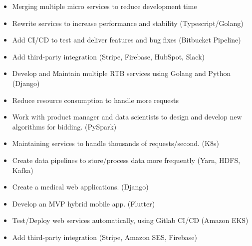 \documentclass[10pt,a4paper,ragged2e]{altacv}
\begin{document}

\begin{fullwidth}
\makecvheader
\end{fullwidth}



\begin{itemize}
    \item Merging multiple micro services to reduce development time
    \item Rewrite services to increase performance and stability (Typescript/Golang)
    \item Add CI/CD to test and deliver features and bug fixes (Bitbucket Pipeline)
    \item Add third-party integration (Stripe, Firebase, HubSpot, Slack)
\end{itemize}
\divider

\begin{itemize}
    \item Develop and Maintain multiple RTB services using Golang and Python (Django)
    \item Reduce resource consumption to handle more requests
    \item Work with product manager and data scientists to design and develop new algorithms for bidding. (PySpark)
    \item Maintaining services to handle thousands of requests/second. (K8s)
    \item Create data pipelines to store/process data more frequently (Yarn, HDFS, Kafka)
\end{itemize}
\divider

\begin{itemize}
    \item Create a medical web applications. (Django)
    \item Develop an MVP hybrid mobile app. (Flutter)
    \item Test/Deploy web services automatically, using Gitlab CI/CD (Amazon EKS)
    \item Add third-party integration  (Stripe, Amazon SES, Firebase)
\end{itemize}
\divider
\end{document}
